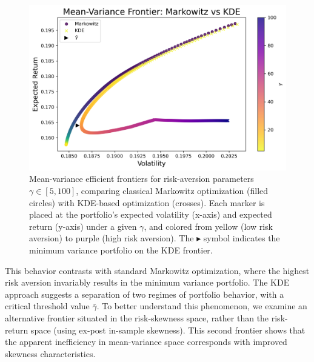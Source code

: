\vspace{5mm}
\begin{figure}[H]
    \begin{center}
    \begin{minipage}{0.65\textwidth}
      \centering
      \includegraphics[width=\textwidth]{images/30_1.png}
    \end{minipage}
    \caption[Mean-variance frontier: Markowitz vs KDE]{Mean-variance efficient frontiers for risk-aversion parameters $\gamma\in[5,100]$, comparing classical Markowitz optimization (filled circles) with KDE-based optimization (crosses). Each marker is placed at the portfolio's expected volatility (x-axis) and expected return (y-axis) under a given $\gamma$, and colored from yellow (low risk aversion) to purple (high risk aversion). The $\blacktriangleright$ symbol indicates the minimum variance portfolio on the KDE frontier.}
    \label{fig:frontier1}
    \end{center}
    \end{figure}



This behavior contrasts with standard Markowitz optimization, where the highest risk aversion invariably results in the minimum variance portfolio. The KDE approach suggests a separation of two regimes of portfolio behavior, with a critical threshold value $\bar{\gamma}$. To better understand this phenomenon, we examine an alternative frontier situated in the risk-skewness space, rather than the risk-return space (using ex-post in-sample skewness). This second frontier shows that the apparent inefficiency in mean-variance space corresponds with improved skewness characteristics. 

